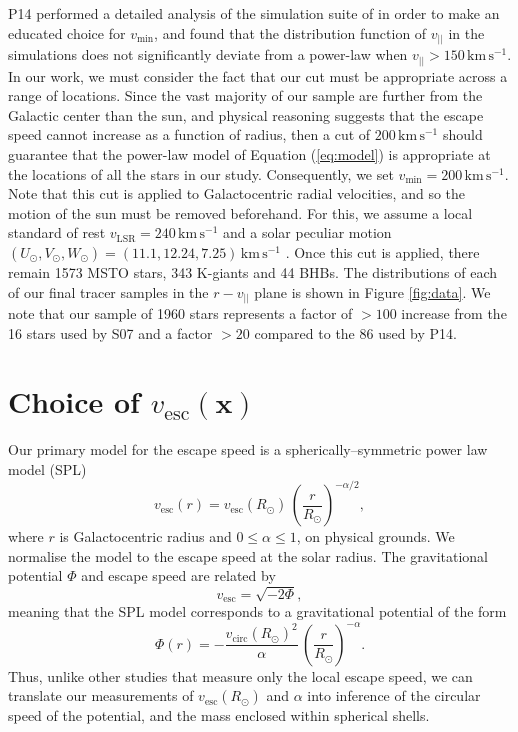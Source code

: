 \documentclass[useAMS,twocolumn,usenatbib]{mn2e}
\def\kms{{\,\mathrm{km\,s^{-1}}}}
\def\vlos{{v_{||}}}
\def\vesc{{v_\mathrm{esc}}}
\def\pos{{\boldsymbol{x}}}
\begin{document}
P14 performed a detailed analysis of the simulation suite of \citet{Sc09} in order to make an educated choice for $v_\mathrm{min}$, and found that the distribution function of $\vlos$ in the simulations does not significantly deviate from a power-law when $\vlos>150\kms$. 
In our work, we must consider the fact that our cut must be appropriate across a range of locations. 
Since the vast majority of our sample are further from the Galactic center than the sun, and physical reasoning suggests that the escape speed cannot increase as a function of radius, then a cut of $200\kms$ should guarantee that the power-law model of Equation (\ref{eq:model}) is appropriate at the locations of all the stars in our study. 
Consequently, we set $v_\mathrm{min}=200\kms$.  
Note that this cut is applied to Galactocentric radial velocities, and so the motion of the sun must be removed beforehand. 
For this, we assume a local standard of rest $v_\mathrm{LSR} = 240\kms$ and a solar peculiar motion $\left(U_\odot,V_\odot,W_\odot\right) = \left(11.1,12.24,7.25\right)\kms$ \citep{Sc10}.
Once this cut is applied, there remain 1573 MSTO stars, 343 K-giants and 44 BHBs. 
The distributions of each of our final tracer samples in the $r-\vlos$ plane is shown in Figure \ref{fig:data}. 
We note that our sample of 1960 stars represents a factor of $>100$ increase from the 16 stars used by S07 and a factor $>20$ compared to the 86 used by P14.

\section{Choice of $\vesc(\pos)$}

\label{sec:pot}

Our primary model for the escape speed is a spherically--symmetric power law model (SPL)
%
\begin{equation}
\vesc(r) = \vesc(R_\odot)\,\left(\dfrac{r}{R_\odot}\right)^{-\alpha/2},
\end{equation}
%
where $r$ is Galactocentric radius and $0 \leq \alpha \leq 1$, on physical grounds.  
We normalise the model to the escape speed at the solar radius. 
The gravitational potential $\Phi$ and escape speed are related by
%
\begin{equation}
\vesc = \sqrt{-2\Phi},
\end{equation}
%
meaning that the SPL model corresponds to a gravitational potential of the form
%
\begin{equation}
\Phi(r) = -\dfrac{v_\mathrm{circ}(R_\odot)^2}{\alpha}\,\left(\dfrac{r}{R_\odot}\right)^{-\alpha}.
\label{eq:splgrav}
\end{equation}
%
Thus, unlike other studies that measure only the local escape speed, we can translate our measurements of $\vesc(R_\odot)$ and $\alpha$ into inference of the circular speed of the potential, and the mass enclosed within spherical shells. 
\end{document}
